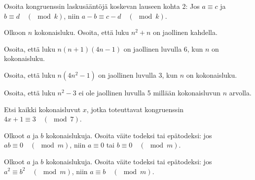\begin{kotitehtavasivu}
\begin{tehtava}
	Osoita kongruenssin laskusääntöjä koskevan lauseen kohta 2: Jos $a\equiv c$ ja $b\equiv d\quad (\mod k)$, niin $a-b\equiv c-d \quad(\mod k)$.
\end{tehtava}

\begin{tehtava}
	Olkoon $n$ kokonaisluku. Osoita, että luku $n^2 + n$ on jaollinen kahdella.
\end{tehtava}

\begin{tehtava}
	Osoita, että luku $n(n + 1)(4n - 1)$ on jaollinen luvulla 6, kun $n$ on kokonaisluku.
\end{tehtava}

\begin{tehtava}
	Osoita, että luku $n(4n^2 - 1)$ on jaollinen luvulla 3, kun $n$ on kokonaisluku.
\end{tehtava}

\begin{tehtava}
	Osoita, että luku $n^2 - 3$ ei ole jaollinen luvulla 5 millään kokonaisluvun $n$ arvolla.
\end{tehtava}

\begin{tehtava}
	Etsi kaikki kokonaisluvut $x$, jotka toteuttavat kongruenssin $4x+1\equiv 3\quad (\mod 7)$.
\end{tehtava}

\begin{tehtava}
	Olkoot $a$ ja $b$ kokonaislukuja. Osoita väite todeksi tai epätodeksi: jos $ab \equiv 0 \quad (\mod m)$, niin $a \equiv 0$ tai $b\equiv 0 \quad (\mod m)$.
\end{tehtava}

\begin{tehtava}
	Olkoot $a$ ja $b$ kokonaislukuja. Osoita väite todeksi tai epätodeksi: jos $a^2 \equiv b^2 \quad (\mod m)$, niin $a \equiv b \quad (\mod m)$.
\end{tehtava}


\end{kotitehtavasivu}
